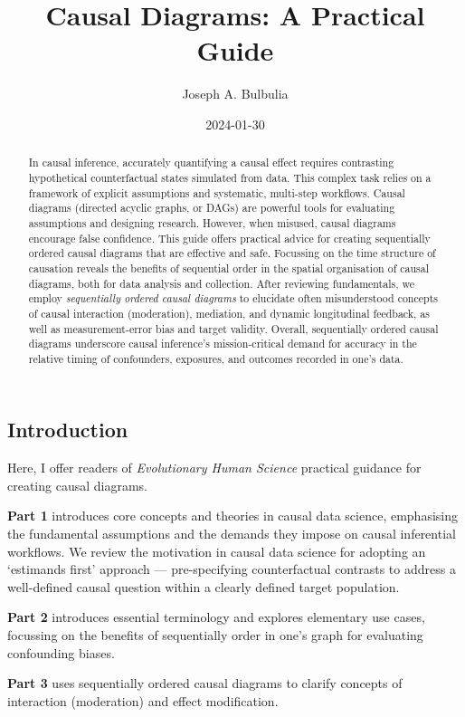 \documentclass[
  singlecolumn]{article}
\title{Causal Diagrams: A Practical Guide}
\author{Joseph A. Bulbulia}
\date{2024-01-30}
\begin{document}
\maketitle
\begin{abstract}
In causal inference, accurately quantifying a causal effect requires
contrasting hypothetical counterfactual states simulated from data. This
complex task relies on a framework of explicit assumptions and
systematic, multi-step workflows. Causal diagrams (directed acyclic
graphs, or DAGs) are powerful tools for evaluating assumptions and
designing research. However, when misused, causal diagrams encourage
false confidence. This guide offers practical advice for creating
sequentially ordered causal diagrams that are effective and safe.
Focussing on the time structure of causation reveals the benefits of
sequential order in the spatial organisation of causal diagrams, both
for data analysis and collection. After reviewing fundamentals, we
employ \emph{sequentially ordered causal diagrams} to elucidate often
misunderstood concepts of causal interaction (moderation), mediation,
and dynamic longitudinal feedback, as well as measurement-error bias and
target validity. Overall, sequentially ordered causal diagrams
underscore causal inference's mission-critical demand for accuracy in
the relative timing of confounders, exposures, and outcomes recorded in
one's data.
\end{abstract}

\subsection{Introduction}\label{introduction}

Here, I offer readers of \emph{Evolutionary Human Science} practical
guidance for creating causal diagrams.

\textbf{Part 1} introduces core concepts and theories in causal data
science, emphasising the fundamental assumptions and the demands they
impose on causal inferential workflows. We review the motivation in
causal data science for adopting an `estimands first' approach ---
pre-specifying counterfactual contrasts to address a well-defined causal
question within a clearly defined target population.

\textbf{Part 2} introduces essential terminology and explores elementary
use cases, focussing on the benefits of sequentially order in one's
graph for evaluating confounding biases.

\textbf{Part 3} uses sequentially ordered causal diagrams to clarify
concepts of interaction (moderation) and effect modification.
\end{document}
